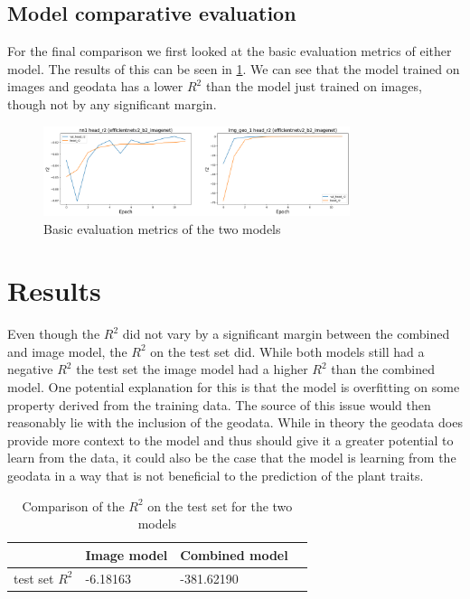 \documentclass[12pt,a4paper,oneside]{article}
\begin{document}

\subsection{Model comparative evaluation}


For the final comparison we first looked at the basic evaluation metrics of either model. The results of this can be seen in \ref{fig:basic_evaluation}. We can see that the model trained on images and geodata has a lower $R^2$ than the model just trained on images, though not by any significant margin. 

\begin{figure}[!h]
    \centering
    \includegraphics[width=0.8\textwidth]{assets/fin_img_vs_geo.png}
    \caption{Basic evaluation metrics of the two models}
    \label{fig:basic_evaluation}
\end{figure}

\smallskip


\section{Results}

Even though the $R^2$ did not vary by a significant margin between the combined and image model, the $R^2$ on the test set did. While both models still had a negative $R^2$ the test set the image model had a higher $R^2$ than the combined model. One potential explanation for this is that the model is overfitting on some property derived from the training data. The source of this issue would then reasonably lie with the inclusion of the geodata. While in theory the geodata does provide more context to the model and thus should give it a greater potential to learn from the data, it could also be the case that the model is learning from the geodata in a way that is not beneficial to the prediction of the plant traits.   

\begin{table}[!h]
    \centering
    \begin{tabular}{@{}llll@{}}
    \toprule
    & Image model & Combined model \\ \midrule
    test set $R^2$              & -6.18163             & -381.62190   \\ \bottomrule
\end{tabular}
\caption{Comparison of the $R^2$ on the test set for the two models}
\end{table}
\end{document}
